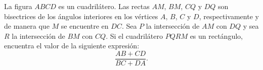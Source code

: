 La figura $ABCD$ es un cuadrilátero. Las rectas $AM$, $BM$, $CQ$ y $DQ$ son bisectrices de los ángulos interiores en los vértices $A$, $B$, $C$ y $D$, respectivamente y de manera que $M$ se encuentre en $DC$. Sea $P$ la intersección de $AM$ con $DQ$ y sea $R$ la intersección de $BM$ con $CQ$. Si el cuadrilátero $PQRM$ es un rectángulo, encuentra el valor de la siguiente expresión:
\[\frac{AB+CD}{BC+DA}.\]
